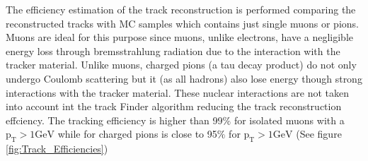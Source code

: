 The efficiency estimation of the track reconstruction is performed comparing the reconstructed tracks with MC samples which 
contains just single muons or pions. Muons are ideal for this purpose since muons, unlike electrons, have a negligible energy loss
through bremsstrahlung radiation due to the interaction with the tracker material. Unlike muons, charged pions (a tau decay product) do not 
only undergo Coulomb scattering but it (as all hadrons) also lose energy though strong interactions with the tracker material. These nuclear 
interactions are not taken into account int the track Finder algorithm reducing the track reconstruction effciency. The tracking efficiency 
is higher than 99$\%$ for isolated muons with a $\textrm{p}_{\textrm{T}}>1 \textrm{GeV}$ while for charged pions is close 
to 95$\%$ for $\textrm{p}_{\textrm{T}}>1 \textrm{GeV}$ \cite{Chatrchyan:2014fea} (See figure \ref{fig:Track_Efficiencies})

